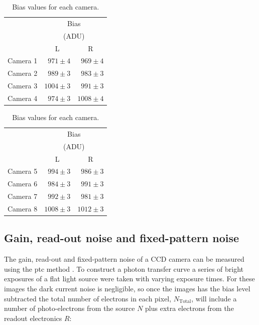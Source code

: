 \begin{colsection}
\begin{colsection}
\begin{table}[t]
    \begin{center}
        \begin{tabular}{c|rr} %
             & \multicolumn{2}{c}{Bias} \\
             & \multicolumn{2}{c}{(ADU)} \\
             & \multicolumn{1}{c}{L} & \multicolumn{1}{c}{R} \\
            \midrule
            Camera 1 & $971\pm4$ & $969\pm4$ \\
            Camera 2 & $989\pm3$ & $983\pm3$ \\
            Camera 3 & $1004\pm3$ & $991\pm3$ \\
            Camera 4 & $974\pm3$ & $1008\pm4$ \\
        \end{tabular}
        \hspace{0.5cm}
        \begin{tabular}{c|rr} %
             & \multicolumn{2}{c}{Bias} \\
             & \multicolumn{2}{c}{(ADU)} \\
             & \multicolumn{1}{c}{L} & \multicolumn{1}{c}{R} \\
            \midrule
            Camera 5 & $994\pm3$ & $986\pm3$ \\
            Camera 6 & $984\pm3$ & $991\pm3$ \\
            Camera 7 & $992\pm3$ & $981\pm3$ \\
            Camera 8 & $1008\pm3$ & $1012\pm3$ \\
        \end{tabular}
    \end{center}
    \caption[Bias values]{
        Bias values for each camera.
        }\label{tab:bias}
\end{table}

\end{colsection}

\newpage
\subsection{Gain, read-out noise and fixed-pattern noise}
\label{sec:ptc}
\begin{colsection}

The gain, read-out and fixed-pattern noise of a CCD camera can be measured using the \gls{ptc} method \citep{CCDs, PTC}. To construct a photon transfer curve a series of bright exposures of a flat light source were taken with varying exposure times. For these images the dark current noise is negligible, so once the images has the bias level subtracted the total number of electrons in each pixel, $N_\text{Total}$, will include a number of photo-electrons from the source $N$ plus extra electrons from the readout electronics $R$:


\end{colsection}
\end{colsection}
